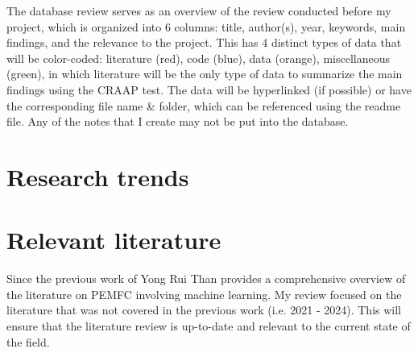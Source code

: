 The database review serves as an overview of the review conducted before my project, which is organized into 6 columns: title, author(s), year, keywords, main findings, and the relevance to the project. This has 4 distinct types of data that will be color-coded: literature (red), code (blue), data (orange), miscellaneous (green), in which literature will be the only type of data to summarize the main findings using the CRAAP test. The data will be hyperlinked (if possible) or have the corresponding file name \& folder, which can be referenced using the readme file. Any of the notes that I create may not be put into the database.  
\section{Research trends}
    
\section{Relevant literature}

    Since the previous work of Yong Rui Than provides a comprehensive overview of the literature on PEMFC involving machine learning. 
    \noindent My review focused on the literature that was not covered in the previous work (i.e. 2021 - 2024). This will ensure that the literature review is up-to-date and relevant to the current state of the field.
    
